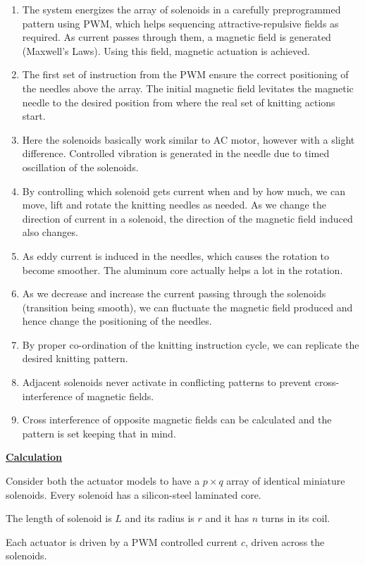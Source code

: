 \documentclass[10pt]{article}
\newcommand{\sectionlabel}[1]{\par\textbf{\underline{#1}}\par}
\begin{document}
\begin{enumerate}
  \item The system energizes the array of solenoids in a carefully preprogrammed pattern using PWM, which helps sequencing attractive-repulsive fields as required. As current passes through them, a magnetic field is generated (Maxwell's Laws). Using this field, magnetic actuation is achieved.
  \item The first set of instruction from the PWM ensure the correct positioning of the needles above the array. The initial magnetic field levitates the magnetic needle to the desired position from where the real set of knitting actions start.
  \item Here the solenoids basically work similar to AC motor, however with a slight difference. Controlled vibration is generated in the needle due to timed oscillation of the solenoids.
  \item By controlling which solenoid gets current when and by how much, we can move, lift and rotate the knitting needles as needed. As we change the direction of current in a solenoid, the direction of the magnetic field induced also changes.
  \item As eddy current is induced in the needles, which causes the rotation to become smoother. The aluminum core actually helps a lot in the rotation.
  \item As we decrease and increase the current passing through the solenoids (transition being smooth), we can fluctuate the magnetic field produced and hence change the positioning of the needles.
  \item By proper co-ordination of the knitting instruction cycle, we can replicate the desired knitting pattern.
  \item Adjacent solenoids never activate in conflicting patterns to prevent cross-interference of magnetic fields.
  \item Cross interference of opposite magnetic fields can be calculated and the pattern is set keeping that in mind.
\end{enumerate}

\sectionlabel{Calculation}

Consider both the actuator models to have a $p\times q$ array of identical miniature solenoids. Every solenoid has a silicon-steel laminated core.

The length of solenoid is $L$ and its radius is $r$ and it has $n$ turns in its coil.

Each actuator is driven by a PWM controlled current $c$, driven across the solenoids.
\end{document}
